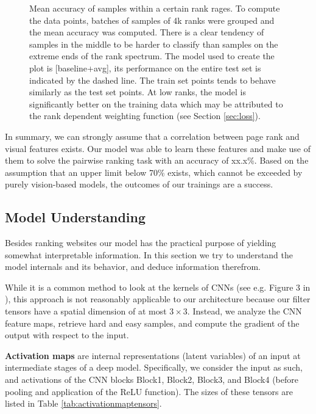 \begin{figure}
\begin{tikzpicture}
      \end{tikzpicture}
    \caption[Accuracy vs. rank]{Mean accuracy of samples within a certain rank rages. To compute the data points, batches of samples of 4k ranks were grouped and the mean accuracy was computed. There is a clear tendency of samples in the middle to be harder to classify than samples on the extreme ends of the rank spectrum. The model used to create the plot is [baseline+avg], its performance on the entire test set is indicated by the dashed line. The train set points tends to behave similarly as the test set points. At low ranks, the model is significantly better on the training data which may be attributed to the rank dependent weighting function (see Section \ref{sec:loss}).}
    \label{fig:accvsrank}
\end{figure}

In summary, we can strongly assume that a correlation between page rank and visual features exists. Our model was able to learn these features and make use of them to solve the pairwise ranking task with an accuracy of xx.x\%. Based on the assumption that an upper limit below 70\% exists, which cannot be exceeded by purely vision-based models, the outcomes of our trainings are a success.

\subsection{Model Understanding}

Besides ranking websites our model has the practical purpose of yielding somewhat interpretable information. In this section we try to understand the model internals and its behavior, and deduce information therefrom.

While it is a common method to look at the kernels of CNNs (see e.g. Figure 3 in \cite{krizhevsky:imagenet}), this approach is not reasonably applicable to our architecture because our filter tensors have a spatial dimension of at most $3\times3$. Instead, we analyze the CNN feature maps, retrieve hard and easy samples, and compute the gradient of the output with respect to the input.

\textbf{Activation maps} are internal representations (latent variables) of an input at intermediate stages of a deep model. Specifically, we consider the input as such, and activations of the CNN blocks Block1, Block2, Block3, and Block4 (before pooling and application of the ReLU function). The sizes of these tensors are listed in Table \ref{tab:activationmaptensors}.


